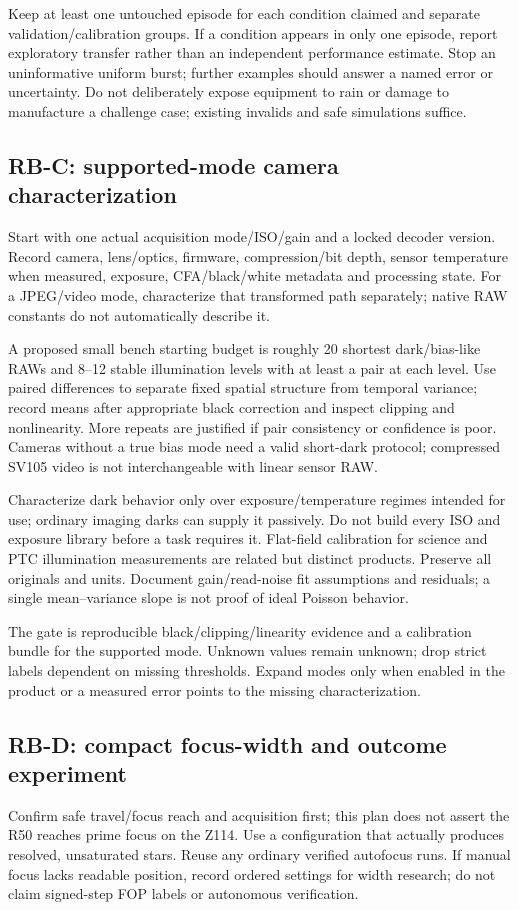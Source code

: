 \documentclass[11pt,a4paper]{article}
\begin{document}
Keep at least one untouched episode for each condition claimed and separate
validation/calibration groups. If a condition appears in only one episode,
report exploratory transfer rather than an independent performance estimate.
Stop an uninformative uniform burst; further examples should answer a named
error or uncertainty. Do not deliberately expose equipment to rain or damage
to manufacture a challenge case; existing invalids and safe simulations suffice.

\subsection{RB-C: supported-mode camera characterization}
Start with one actual acquisition mode/ISO/gain and a locked decoder version.
Record camera, lens/optics, firmware, compression/bit depth, sensor temperature
when measured, exposure, CFA/black/white metadata and processing state. For a
JPEG/video mode, characterize that transformed path separately; native RAW
constants do not automatically describe it.

A proposed small bench starting budget is roughly 20 shortest dark/bias-like
RAWs and 8--12 stable illumination levels with at least a pair at each level.
Use paired differences to separate fixed spatial structure from temporal
variance; record means after appropriate black correction and inspect clipping
and nonlinearity. More repeats are justified if pair consistency or confidence
is poor. Cameras without a true bias mode need a valid short-dark protocol;
compressed SV105 video is not interchangeable with linear sensor RAW.

Characterize dark behavior only over exposure/temperature regimes intended for
use; ordinary imaging darks can supply it passively. Do not build every ISO and
exposure library before a task requires it. Flat-field calibration for science
and PTC illumination measurements are related but distinct products. Preserve
all originals and units. Document gain/read-noise fit assumptions and residuals;
a single mean--variance slope is not proof of ideal Poisson behavior.

The gate is reproducible black/clipping/linearity evidence and a calibration
bundle for the supported mode. Unknown values remain unknown; drop strict
labels dependent on missing thresholds. Expand modes only when enabled in the
product or a measured error points to the missing characterization.

\subsection{RB-D: compact focus-width and outcome experiment}
Confirm safe travel/focus reach and acquisition first; this plan does not
assert the R50 reaches prime focus on the Z114. Use a configuration that actually
produces resolved, unsaturated stars. Reuse any ordinary verified autofocus
runs. If manual focus lacks readable position, record ordered settings for
width research; do not claim signed-step FOP labels or autonomous verification.
\end{document}
